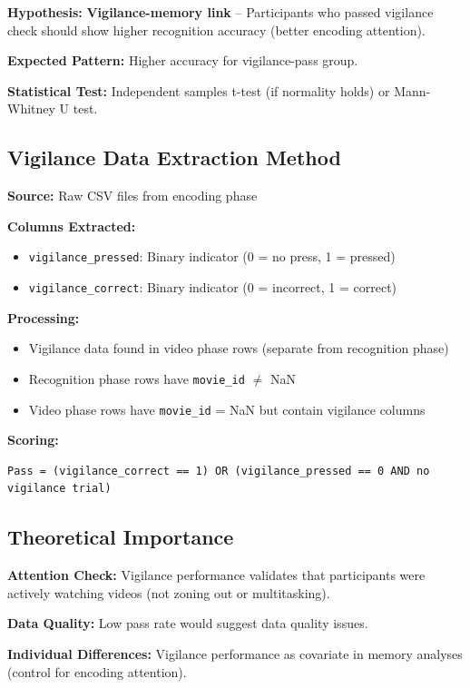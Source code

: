 \documentclass[12pt,a4paper]{article}
\begin{document}
\textbf{Hypothesis:} \textbf{Vigilance-memory link} -- Participants who passed vigilance check should show higher recognition accuracy (better encoding attention).

\textbf{Expected Pattern:} Higher accuracy for vigilance-pass group.

\textbf{Statistical Test:} Independent samples t-test (if normality holds) or Mann-Whitney U test.

\subsection{Vigilance Data Extraction Method}

\textbf{Source:} Raw CSV files from encoding phase

\textbf{Columns Extracted:}
\begin{itemize}
    \item \texttt{vigilance\_pressed}: Binary indicator (0 = no press, 1 = pressed)
    \item \texttt{vigilance\_correct}: Binary indicator (0 = incorrect, 1 = correct)
\end{itemize}

\textbf{Processing:}
\begin{itemize}
    \item Vigilance data found in video phase rows (separate from recognition phase)
    \item Recognition phase rows have \texttt{movie\_id} $\neq$ NaN
    \item Video phase rows have \texttt{movie\_id} = NaN but contain vigilance columns
\end{itemize}

\textbf{Scoring:} 
\begin{verbatim}
Pass = (vigilance_correct == 1) OR (vigilance_pressed == 0 AND no vigilance trial)
\end{verbatim}

\subsection{Theoretical Importance}

\textbf{Attention Check:} Vigilance performance validates that participants were actively watching videos (not zoning out or multitasking).

\textbf{Data Quality:} Low pass rate would suggest data quality issues.

\textbf{Individual Differences:} Vigilance performance as covariate in memory analyses (control for encoding attention).
\end{document}
